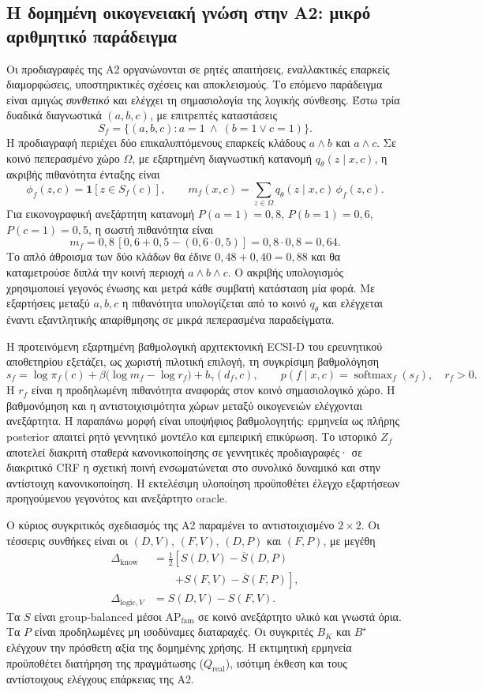 \documentclass[11pt,a4paper]{article}
\begin{document}
\subsection{Η δομημένη οικογενειακή γνώση στην Α2: μικρό αριθμητικό παράδειγμα}
Οι προδιαγραφές της Α2 οργανώνονται σε ρητές απαιτήσεις, εναλλακτικές επαρκείς διαμορφώσεις, υποστηρικτικές σχέσεις και αποκλεισμούς. Το επόμενο παράδειγμα είναι αμιγώς \emph{συνθετικό} και ελέγχει τη σημασιολογία της λογικής σύνθεσης. Έστω τρία δυαδικά διαγνωστικά $(a,b,c)$, με επιτρεπτές καταστάσεις
\[
 S_f=\{(a,b,c):a=1\ \land\ (b=1\lor c=1)\}.
\]
Η προδιαγραφή περιέχει δύο επικαλυπτόμενους επαρκείς κλάδους $a\land b$ και $a\land c$. Σε κοινό πεπερασμένο χώρο $\Omega$, με εξαρτημένη διαγνωστική κατανομή $q_\theta(z\mid x,c)$, η ακριβής πιθανότητα ένταξης είναι
\[
 \phi_f(z,c)=\mathbf 1[z\in S_f(c)],\qquad
 m_f(x,c)=\sum_{z\in\Omega}q_\theta(z\mid x,c)\,\phi_f(z,c).
\]
Για εικονογραφική ανεξάρτητη κατανομή $P(a=1)=0{,}8$, $P(b=1)=0{,}6$, $P(c=1)=0{,}5$, η σωστή πιθανότητα είναι
\[
 m_f=0{,}8\,[0{,}6+0{,}5-(0{,}6\cdot0{,}5)]
 =0{,}8\cdot0{,}8=0{,}64.
\]
Το απλό άθροισμα των δύο κλάδων θα έδινε $0{,}48+0{,}40=0{,}88$ και θα καταμετρούσε διπλά την κοινή περιοχή $a\land b\land c$. Ο ακριβής υπολογισμός χρησιμοποιεί γεγονός ένωσης και μετρά κάθε συμβατή κατάσταση μία φορά. Με εξαρτήσεις μεταξύ $a,b,c$ η πιθανότητα υπολογίζεται από το κοινό $q_\theta$ και ελέγχεται έναντι εξαντλητικής απαρίθμησης σε μικρά πεπερασμένα παραδείγματα.

Η προτεινόμενη εξαρτημένη βαθμολογική αρχιτεκτονική ECSI-D του ερευνητικού αποθετηρίου εξετάζει, ως χωριστή πιλοτική επιλογή, τη συγκρίσιμη βαθμολόγηση
\[
 s_f=\log\pi_f(c)+\beta\bigl(\log m_f-\log r_f\bigr)+b_\gamma(d_f,c),
 \qquad p(f\mid x,c)=\operatorname{softmax}_f(s_f),\quad r_f>0.
\]
Η $r_f$ είναι η προδηλωμένη πιθανότητα αναφοράς στον κοινό σημασιολογικό χώρο. Η βαθμονόμηση και η αντιστοιχισιμότητα χώρων μεταξύ οικογενειών ελέγχονται ανεξάρτητα. Η παραπάνω μορφή είναι υποψήφιος βαθμολογητής: ερμηνεία ως πλήρης posterior απαιτεί ρητό γεννητικό μοντέλο και εμπειρική επικύρωση. Το ιστορικό $Z_f$ αποτελεί διακριτή σταθερά κανονικοποίησης σε γεννητικές προδιαγραφές· σε διακριτικό CRF η σχετική ποινή ενσωματώνεται στο συνολικό δυναμικό και στην αντίστοιχη κανονικοποίηση. Η εκτελέσιμη υλοποίηση προϋποθέτει έλεγχο εξαρτήσεων προηγούμενου γεγονότος και ανεξάρτητο oracle.

Ο κύριος συγκριτικός σχεδιασμός της Α2 παραμένει το αντιστοιχισμένο $2\times2$. Οι τέσσερις συνθήκες είναι οι $(D,V)$, $(F,V)$, $(D,P)$ και $(F,P)$, με μεγέθη
\[
\begin{aligned}
 \Delta_{\mathrm{know}}&=\tfrac12\left[S(D,V)-\overline S(D,P)\right.\\
 &\qquad\left.+S(F,V)-\overline S(F,P)\right],\\
 \Delta_{\mathrm{logic},V}&=S(D,V)-S(F,V).
\end{aligned}
\]
Τα $S$ είναι group-balanced μέσοι $\mathrm{AP}_{\mathrm{fam}}$ σε κοινό ανεξάρτητο υλικό και γνωστά όρια. Τα $P$ είναι προδηλωμένες μη ισοδύναμες διαταραχές. Οι συγκριτές $B_K$ και $B^\star$ ελέγχουν την πρόσθετη αξία της δομημένης χρήσης. Η εκτιμητική ερμηνεία προϋποθέτει διατήρηση της πραγμάτωσης ($Q_{\mathrm{real}}$), ισότιμη έκθεση και τους αντίστοιχους ελέγχους επάρκειας της Α2.
\end{document}
